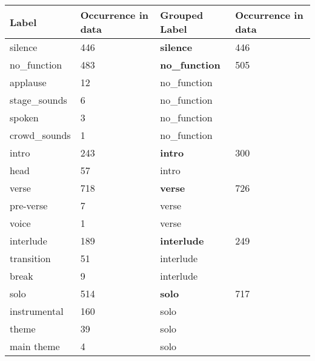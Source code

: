 \begin{table}[t]
    \centering
    \begin{tabular}{|l|l|l|l|}
    \hline
    \textbf{Label}         & \textbf{Occurrence in data} & \textbf{Grouped Label} & \textbf{Occurrence in data} \\ \hline\hline
    silence       & 446                & \textbf{silence}       & 446                \\ \hline
    no\_function  & 483                & \textbf{no\_function}  & 505                \\ \hline
    applause      & 12                 & no\_function  &                    \\ \hline
    stage\_sounds & 6                  & no\_function  &                    \\ \hline
    spoken        & 3                  & no\_function  &                    \\ \hline
    crowd\_sounds & 1                  & no\_function  &                    \\ \hline
    intro         & 243                & \textbf{intro}         & 300                \\ \hline
    head          & 57                 & intro         &                    \\ \hline
    verse         & 718                & \textbf{verse}         & 726                \\ \hline
    pre-verse     & 7                  & verse         &                    \\ \hline
    voice         & 1                  & verse         &                    \\ \hline
    interlude     & 189                & \textbf{interlude}     & 249                \\ \hline
    transition    & 51                 & interlude     &                    \\ \hline
    break         & 9                  & interlude     &                    \\ \hline
    solo          & 514                & \textbf{solo}          & 717                \\ \hline
    instrumental  & 160                & solo          &                    \\ \hline
    theme         & 39                 & solo          &                    \\ \hline
    main theme    & 4                  & solo          &                    \\ \hline

\end{tabular}
\end{table}

